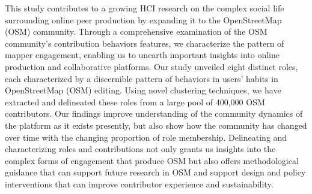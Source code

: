 \documentclass[manuscript,screen,review]{acmart}
\begin{document}
This study contributes to a growing HCI research on the complex social life surrounding online peer production by expanding it to the OpenStreetMap (OSM) community. Through a comprehensive examination of the OSM community’s contribution behaviors features, we characterize the pattern of mapper engagement, enabling us to unearth important insights into online production and collaborative platforms. Our study unveiled eight distinct roles, each characterized by a discernible pattern of behaviors in users’ habits in OpenStreetMap (OSM) editing. Using novel clustering techniques, we have extracted and delineated these roles from a large pool of 400,000 OSM contributors. Our findings improve understanding of the community dynamics of the platform as it exists presently, but also show how the community has changed over time with the changing proportion of role membership. Delineating and characterizing roles and contributions not only grants us insights into the complex forms of engagement that produce OSM but also offers methodological guidance that can support future research in OSM and support design and policy interventions that can improve contributor experience and sustainability.  



\end{document}
